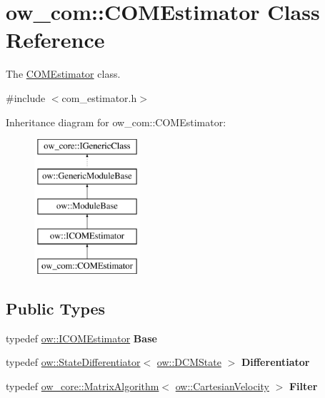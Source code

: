 \hypertarget{classow__com_1_1COMEstimator}{}\section{ow\+\_\+com\+:\+:C\+O\+M\+Estimator Class Reference}
\label{classow__com_1_1COMEstimator}


The \hyperlink{classow__com_1_1COMEstimator}{C\+O\+M\+Estimator} class.  




{\ttfamily \#include $<$com\+\_\+estimator.\+h$>$}

Inheritance diagram for ow\+\_\+com\+:\+:C\+O\+M\+Estimator\+:\begin{figure}[H]
\begin{center}
\leavevmode
\includegraphics[height=5.000000cm]{d8/d3a/classow__com_1_1COMEstimator}
\end{center}
\end{figure}
\subsection*{Public Types}
\begin{DoxyCompactItemize}
\item 
typedef \hyperlink{classow_1_1ICOMEstimator}{ow\+::\+I\+C\+O\+M\+Estimator} {\bfseries Base}\hypertarget{classow__com_1_1COMEstimator_a8df645b753b836444a3f78158107225a}{}\label{classow__com_1_1COMEstimator_a8df645b753b836444a3f78158107225a}

\item 
typedef \hyperlink{classow__core_1_1StateDifferentiator}{ow\+::\+State\+Differentiator}$<$ \hyperlink{classow__core_1_1DivergentComponentOfMotionState}{ow\+::\+D\+C\+M\+State} $>$ {\bfseries Differentiator}\hypertarget{classow__com_1_1COMEstimator_a685e59ab89753796b80e878bfb8fff5a}{}\label{classow__com_1_1COMEstimator_a685e59ab89753796b80e878bfb8fff5a}

\item 
typedef \hyperlink{classow__core_1_1MatrixAlgorithm}{ow\+\_\+core\+::\+Matrix\+Algorithm}$<$ \hyperlink{classow__core_1_1CartesianVelocity}{ow\+::\+Cartesian\+Velocity} $>$ {\bfseries Filter}\hypertarget{classow__com_1_1COMEstimator_a0936ebb8c797a8e164a140a07fd9142d}{}\label{classow__com_1_1COMEstimator_a0936ebb8c797a8e164a140a07fd9142d}

\end{DoxyCompactItemize}
